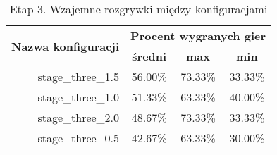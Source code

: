 \begin{longtable}[c]{|r|c|c|c|}
\caption{\label{tab:results/stage_three_all_play_all}Etap 3. Wzajemne rozgrywki między konfiguracjami} \\
\hline

\multirow{2}{*}{\textbf{Nazwa konfiguracji}} & \multicolumn{3}{|c|}{\textbf{Procent wygranych gier}} \\
\cline{2-4}
&\textbf{średni} & \textbf{max} & \textbf{min} \\
\hline
stage\_three\_1.5 & 56.00\% & 73.33\% & 33.33\% \\
\hline
stage\_three\_1.0 & 51.33\% & 63.33\% & 40.00\% \\
\hline
stage\_three\_2.0 & 48.67\% & 73.33\% & 33.33\% \\
\hline
stage\_three\_0.5 & 42.67\% & 63.33\% & 30.00\% \\
\hline
\end{longtable}
